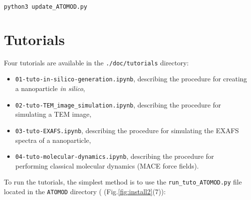 \documentclass[12pt,a4paper,french]{book}
\begin{document}
\verb+python3 update_ATOMOD.py+



\section*{Tutorials}

%
%

Four tutorials are available in the \verb+./doc/tutorials+ directory:
\begin{itemize}
	\item \verb+01-tuto-in-silico-generation.ipynb+, describing the procedure for creating a nanoparticle \textit{in silico},
	\item \verb+02-tuto-TEM_image_simulation.ipynb+, describing the procedure for simulating a TEM image,
	\item \verb+03-tuto-EXAFS.ipynb+, describing the procedure for simulating the EXAFS spectra of a nanoparticle,
	\item \verb+04-tuto-molecular-dynamics.ipynb+, describing the procedure for performing classical molecular dynamics (MACE force fields).
\end{itemize}

To run the tutorials, the simplest method is to use the \verb+run_tuto_ATOMOD.py+ file located in the \verb+ATOMOD+ directory ( (Fig.\ref{fig:install2}(7)):
\end{document}
